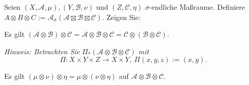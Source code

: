 \begin{Problem}
	Seien $(X,\mathcal{A},\mu),(Y,\mathcal{B},\nu)$ und $(Z,\mathcal{C},\eta)$ $\sigma$-endliche Maßraume. Definiere $A\otimes B\otimes C:=\mathcal{A}_{\sigma}(\mathcal{A}\boxtimes\mathcal{B}\boxtimes\mathcal{C})$. Zeigen Sie:
	\begin{parts}
		\item Es gilt $(\mathcal{A}\otimes \mathcal{B})\otimes \mathcal{C}=\mathcal{A}\otimes \mathcal{B}\otimes \mathcal{C}=\mathcal{C}\otimes (\mathcal{B}\otimes \mathcal{C})$.
			
			{\footnotesize \emph{Hinweis: Betrachten Sie} $\Pi_{*}(\mathcal{A}\otimes \mathcal{B}\otimes \mathcal{C})$ \emph{mit}
				\[
				\Pi:X\times Y\times Z\to X\times Y,~\Pi(x,y,z):=(x,y)
		.\]} 
			\item Es gilt $(\mu\otimes \nu)\otimes \eta=\mu\otimes(\nu\otimes\eta)$ auf $\mathcal{A}\otimes \mathcal{B}\otimes \mathcal{C}$.
	\end{parts}
\end{Problem}

